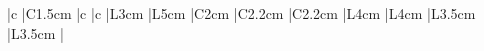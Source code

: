 \documentclass[10pt, landscape]{article}
\begin{document}
    \begin{table}[]
        \begin{tabular}{
                |c %
                |C{1.5cm} %
                |c %
                |c %
                |L{3cm} %
                |L{5cm} %
                |C{2cm} %
                |C{2.2cm} %
                |C{2.2cm} %
                |L{4cm} %
                |L{4cm} %
                |L{3.5cm} %
                |L{3.5cm} %
                |
                }
            \hline\hline
            
            \\\hline\hline
        \end{tabular}
    \end{table}
\end{document}
